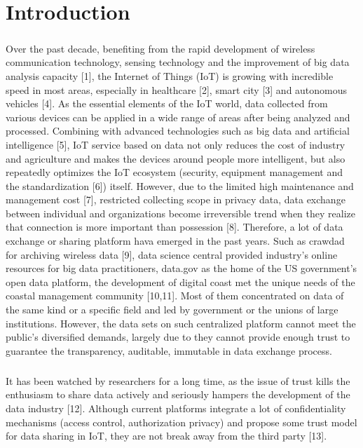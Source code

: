 \chapter{Introduction }
\paragraph{}Over the past decade, benefiting from the rapid
development of wireless communication technology, sensing
technology and the improvement of big data analysis
capacity [1], the Internet of Things (IoT) is growing with
incredible speed in most areas, especially in healthcare [2],
smart city [3] and autonomous vehicles [4]. As the essential
elements of the IoT world, data collected from various
devices can be applied in a wide range of areas after being
analyzed and processed. Combining with advanced
technologies such as big data and artificial intelligence [5],
IoT service based on data not only reduces the cost of industry and agriculture and makes the devices around
people more intelligent, but also repeatedly optimizes the
IoT ecosystem (security, equipment management and the
standardization [6]) itself. However, due to the limited high
maintenance and management cost [7], restricted collecting
scope in privacy data, data exchange between individual and
organizations become irreversible trend when they realize
that connection is more important than possession [8].
Therefore, a lot of data exchange or sharing platform hava
emerged in the past years. Such as crawdad for archiving
wireless data [9], data science central provided industry’s
online resources for big data practitioners, data.gov as the
home of the US government’s open data platform, the
development of digital coast met the unique needs of the
coastal management community [10,11]. Most of them
concentrated on data of the same kind or a specific field and
led by government or the unions of large institutions.
However, the data sets on such centralized platform cannot
meet the public’s diversified demands, largely due to they
cannot provide enough trust to guarantee the transparency,
auditable, immutable in data exchange process.
\paragraph{}It has been watched by researchers for a long time, as the issue of trust kills the enthusiasm to share data actively and seriously hampers the development of the data industry [12]. Although current platforms integrate a lot of confidentiality mechanisms (access control, authorization privacy) and propose some trust model for data sharing in IoT, they are not break away from the third party [13].
